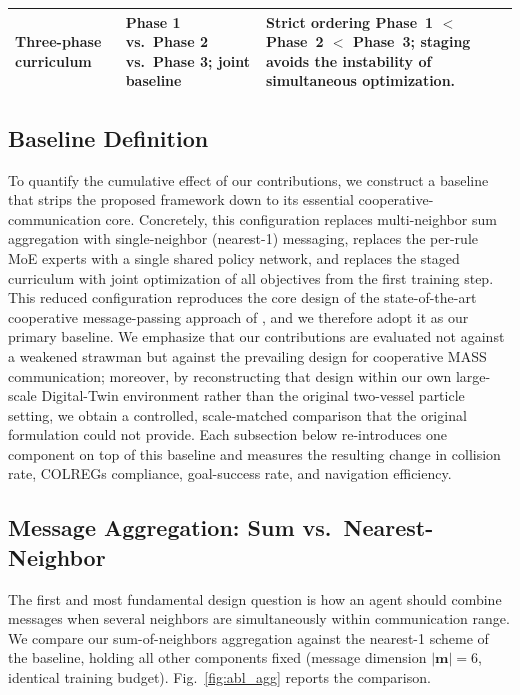 \documentclass[final,5p,times,twocolumn]{elsarticle}
\begin{document}
{\begin{table}[t]
\begin{tabularx}{\textwidth}{
    >{\raggedright\arraybackslash}p{}
    >{\raggedright\arraybackslash}p{}
    >{\raggedright\arraybackslash}X}
\addlinespace
Three-phase curriculum
& Phase 1 vs.\ Phase 2 vs.\ Phase 3; joint baseline
& Strict ordering Phase~1 $<$ Phase~2 $<$ Phase~3; staging avoids the instability of simultaneous optimization. \\

\bottomrule
\end{tabularx}
\end{table}

\subsection{Baseline Definition}
\label{sec:abl_baseline}
To quantify the cumulative effect of our contributions, we construct a baseline that strips the proposed framework down to its essential cooperative-communication core. Concretely, this configuration replaces multi-neighbor sum aggregation with single-neighbor (nearest-1) messaging, replaces the per-rule MoE experts with a single shared policy network, and replaces the staged curriculum with joint optimization of all objectives from the first training step. This reduced configuration reproduces the core design of the state-of-the-art cooperative message-passing approach of \citet{WangZhao2025}, and we therefore adopt it as our primary baseline. We emphasize that our contributions are evaluated not against a weakened strawman but against the prevailing design for cooperative MASS communication; moreover, by reconstructing that design within our own large-scale Digital-Twin environment rather than the original two-vessel particle setting, we obtain a controlled, scale-matched comparison that the original formulation could not provide. Each subsection below re-introduces one component on top of this baseline and measures the resulting change in collision rate, COLREGs compliance, goal-success rate, and navigation efficiency.

\subsection{Message Aggregation: Sum vs.\ Nearest-Neighbor}
\label{sec:abl_aggregation}
The first and most fundamental design question is how an agent should combine messages when several neighbors are simultaneously within communication range. We compare our sum-of-neighbors aggregation against the nearest-1 scheme of the baseline, holding all other components fixed (message dimension $|\mathbf{m}|=6$, identical training budget). Fig.~\ref{fig:abl_agg} reports the comparison. 

}
\end{document}
